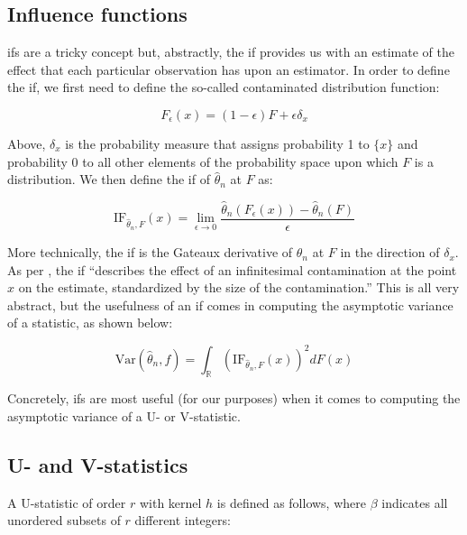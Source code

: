 \documentclass{report}
\begin{document}
\subsection{Influence functions}

\Glspl{if} are a tricky concept but, abstractly, the \gls{if} provides us with an estimate of the effect that each particular observation has upon an estimator. In order to define the \gls{if}, we first need to define the so-called contaminated distribution function:

\begin{equation}\label{eq:lst-if-contaminated-dist-function}
    F_\epsilon(x) = (1 - \epsilon)F + \epsilon\delta_x
\end{equation}

Above, $\delta_x$ is the probability measure that assigns probability 1 to $\{x\}$ and probability 0 to all other elements of the probability space upon which $F$ is a distribution. We then define the \gls{if} of $\hat{\theta}_n$ at $F$ as:

\begin{equation}\label{eq:lst-if}
    \text{IF}_{\hat{\theta}_n, F}(x) = \lim_{\epsilon \to 0} \frac{\hat{\theta}_n(F_\epsilon(x)) - \hat{\theta}_n(F)}{\epsilon}
\end{equation}

More technically, the \gls{if} is the Gateaux derivative of $\hat{\theta}_n$ at $F$ in the direction of $\delta_x$. As per \cite[Chapter~2.1]{hampel_robust_2011}, the \gls{if} ``describes the effect of an infinitesimal contamination at the point $x$ on the estimate, standardized by the size of the contamination.'' This is all very abstract, but the usefulness of an \gls{if} comes in computing the asymptotic variance of a statistic, as shown below:

\begin{equation}\label{eq:lst-if-variance}
    \text{Var}\left(\hat{\theta}_n, f\right) = \int_{\mathbb{R}} \left(\text{IF}_{\hat{\theta}_n, F}(x)\right)^2 dF(x)
\end{equation}

Concretely, \glspl{if} are most useful (for our purposes) when it comes to computing the asymptotic variance of a U- or V-statistic. 

\subsection{U- and V-statistics}

A U-statistic of order $r$ with kernel $h$ is defined as follows, where $\beta$ indicates all unordered subsets of $r$ different integers:
\end{document}
